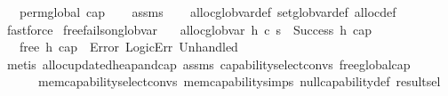 \begin{isabellebody}
\ \ \ {\isachardoublequoteopen}perm{\isacharunderscore}{\kern0pt}global\ cap{\isachardoublequoteclose}\isanewline
%
\isadelimproof
\ \ %
\endisadelimproof
%
\isatagproof
{}\isamarkupfalse%
\ assms\isanewline
\ \ \isamarkupfalse%
\ alloc{\isacharunderscore}{\kern0pt}glob{\isacharunderscore}{\kern0pt}var{\isacharunderscore}{\kern0pt}def\ set{\isacharunderscore}{\kern0pt}glob{\isacharunderscore}{\kern0pt}var{\isacharunderscore}{\kern0pt}def\ alloc{\isacharunderscore}{\kern0pt}def\isanewline
\ \ \isamarkupfalse%
\ fastforce%
\endisatagproof
{\isafoldproof}%
%
\isadelimproof
\isanewline
%
\endisadelimproof
\isanewline
\isanewline
\isanewline
{}\isamarkupfalse%
\ free{\isacharunderscore}{\kern0pt}fails{\isacharunderscore}{\kern0pt}on{\isacharunderscore}{\kern0pt}glob{\isacharunderscore}{\kern0pt}var{\isacharcolon}{\kern0pt}\isanewline
\ \ \ {\isachardoublequoteopen}alloc{\isacharunderscore}{\kern0pt}glob{\isacharunderscore}{\kern0pt}var\ h\ c\ s\ {\isacharequal}{\kern0pt}\ Success\ {\isacharparenleft}{\kern0pt}h{\isacharprime}{\kern0pt}{\isacharcomma}{\kern0pt}\ cap{\isacharparenright}{\kern0pt}{\isachardoublequoteclose}\isanewline
\ \ \ {\isachardoublequoteopen}free\ h{\isacharprime}{\kern0pt}\ cap\ {\isacharequal}{\kern0pt}\ Error\ {\isacharparenleft}{\kern0pt}LogicErr\ {\isacharparenleft}{\kern0pt}Unhandled\ {}{\isacharparenright}{\kern0pt}{\isacharparenright}{\kern0pt}{\isachardoublequoteclose}\isanewline
%
\isadelimproof
\ \ %
\endisadelimproof
%
\isatagproof
{}\isamarkupfalse%
\ {\isacharparenleft}{\kern0pt}metis\ alloc{\isacharunderscore}{\kern0pt}updated{\isacharunderscore}{\kern0pt}heap{\isacharunderscore}{\kern0pt}and{\isacharunderscore}{\kern0pt}cap\ assms\ capability{\isachardot}{\kern0pt}select{\isacharunderscore}{\kern0pt}convs{\isacharparenleft}{\kern0pt}{}{\isacharparenright}{\kern0pt}\ free{\isacharunderscore}{\kern0pt}global{\isacharunderscore}{\kern0pt}cap\ \isanewline
\ \ \ \ \ \ mem{\isacharunderscore}{\kern0pt}capability{\isachardot}{\kern0pt}select{\isacharunderscore}{\kern0pt}convs{\isacharparenleft}{\kern0pt}{}{}{\isacharparenright}{\kern0pt}\ mem{\isacharunderscore}{\kern0pt}capability{\isachardot}{\kern0pt}simps{\isacharparenleft}{\kern0pt}{}{}{\isacharparenright}{\kern0pt}\ null{\isacharunderscore}{\kern0pt}capability{\isacharunderscore}{\kern0pt}def\ result{\isachardot}{\kern0pt}sel{\isacharparenleft}{\kern0pt}{}{\isacharparenright}{\kern0pt}\ \isanewline

\end{isabellebody}
